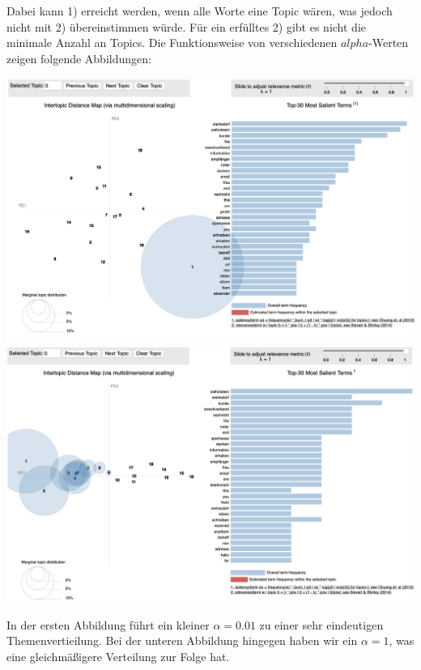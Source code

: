\documentclass[german,version-2020-11]{uzl-thesis}
\begin{document}
Dabei kann 1) erreicht werden, wenn alle Worte eine Topic wären, was jedoch nicht mit 2) übereinstimmen würde. Für ein erfülltes 2) gibt es nicht die minimale Anzahl an Topics. Die Funktionsweise von verschiedenen $alpha$-Werten zeigen folgende Abbildungen: 
\\
\begin{center}
\includegraphics[scale=0.3]{lda_alpha001.png}\\
\includegraphics[scale=0.3]{lda_alpha1.png}\\
\end{center}
In der ersten Abbildung führt ein kleiner $\alpha = 0.01$ zu einer sehr eindeutigen Themenvertieilung. Bei der unteren Abbildung hingegen haben wir ein $\alpha = 1$, was eine gleichmäßigere Verteilung zur Folge hat.

\end{document}
